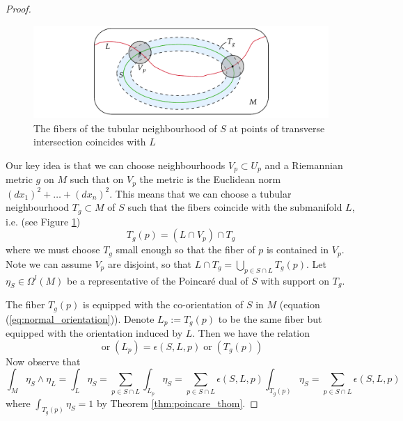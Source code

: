 \begin{proof}

 	\begin{figure}[htb]
		\hfill
 		\begin{minipage}[c]{0.6\textwidth}
			\includegraphics[trim={35mm 0 35mm 0},clip,width=\textwidth]{figs/tubular_intersection.pdf}
 		\end{minipage} 
 		\begin{minipage}[c]{0.38\textwidth}
 	        \caption{The fibers of the tubular neighbourhood of $S$ at points of
			transverse intersection coincides with  $L$}
 	        \label{fig:tubular_intersection}
 		\end{minipage} 
 	\end{figure}	
	Our key idea is that we can choose neighbourhoods $V_p \subset U_p$
	and a Riemannian metric $g$ on  $M$ such that on $V_p$ the metric is the
	Euclidean norm $(dx_1)^2 + \ldots+(dx_n)^2$. This means that we can choose a
	tubular neighbourhood $T_g \subset M$ of $S$  such that the fibers coincide
	with the submanifold $L$, i.e. (see Figure \ref{fig:tubular_intersection})
	\[
	T_g(p) = (L \cap V_p) \cap T_g
	\] 
	where we must choose $T_g$ small enough so that the fiber of $p$ is 
	contained in $V_p$. Note we can assume $V_p$ are disjoint, so that $L\cap
	T_g = \bigcup_{p\in S\cap L} T_g(p)$. Let $\eta_S \in \Omega^l(M)$ be a
	representative of the Poincar\'e dual of $S$ with support on  $T_g$. 
	
	The fiber $T_g(p)$ is equipped with the co-orientation of  $S$ in $M$
	(equation (\ref{eq:normal_orientation})). 
	Denote $L_p := T_g(p)$ to be the same fiber but equipped with the
	orientation induced by  $L$. Then we have the relation 
	\[
		\operatorname{or}(L_p) = \epsilon(S,L,p) \operatorname{or}(T_g(p))
	\] 
	Now observe that 
	\[
	\int_M \eta_S \wedge \eta_L 
	= \int_L \eta_S
	= \sum_{p\in S\cap L} \int_{L_p} \eta_S
	= \sum_{p\in S\cap L} \epsilon(S,L,p)\int_{T_g(p)} \eta_S
	= \sum_{p\in S\cap L} \epsilon(S,L,p)
	\] 
	where $\int_{T_g(p)}\eta_S = 1$ by Theorem \ref{thm:poincare_thom}.
\end{proof}

